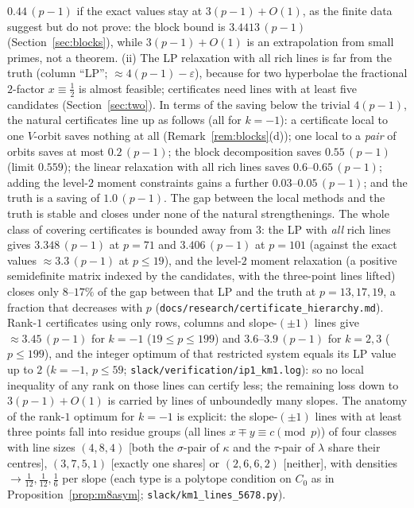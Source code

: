 \documentclass[11pt]{article}
\theoremstyle{remark}
\begin{document}
$0.44\,(p-1)$ if the exact values stay at $3(p-1)+O(1)$, as the finite data suggest but do not prove: the block bound is $3.4413\,(p-1)$ (Section~\ref{sec:blocks}), while $3(p-1)+O(1)$ is an extrapolation from small primes, not a theorem.  (ii) The LP relaxation with all rich lines is far
from the truth (column ``LP''; $\approx4(p-1)-\varepsilon$), because for two hyperbolae the fractional $2$-factor $x\equiv\tfrac12$ is
almost feasible; certificates need lines with at least five candidates (Section~\ref{sec:two}).  In terms of the saving below the trivial $4(p-1)$, the natural certificates line up as follows (all for $k=-1$):
a certificate local to one $V$-orbit saves nothing at all (Remark~\ref{rem:blocks}(d)); one local to a \emph{pair} of orbits saves at most
$0.2\,(p-1)$; the block decomposition saves $0.55\,(p-1)$ (limit $0.559$); the linear relaxation with all rich lines saves
$0.6$--$0.65\,(p-1)$; adding the level-$2$ moment constraints gains a further $0.03$--$0.05\,(p-1)$; and the truth is a saving of
$1.0\,(p-1)$.  The gap between the local methods and the truth is stable and closes under none of the natural strengthenings.
The whole class of covering certificates is bounded away from $3$: the LP with \emph{all}
rich lines gives $3.348\,(p-1)$ at $p=71$ and $3.406\,(p-1)$ at $p=101$ (against the exact values $\approx3.3\,(p-1)$ at $p\le19$), and the
level-$2$ moment relaxation (a positive semidefinite matrix indexed by the candidates, with the three-point lines lifted) closes only
$8$--$17\%$ of the gap between that LP and the truth at $p=13,17,19$, a fraction that decreases with $p$
(\texttt{docs/research/certificate\_hierarchy.md}).  Rank-$1$ certificates using only
rows, columns and slope-$(\pm1)$ lines give $\approx3.45\,(p-1)$ for $k=-1$ ($19\le p\le199$) and $3.6$--$3.9\,(p-1)$ for $k=2,3$
($p\le199$), and the integer optimum of that restricted system equals its LP value up to $2$ ($k=-1$, $p\le59$; \texttt{slack/verification/ip1\_km1.log}): so no local
inequality of any rank on those lines can certify less; the remaining loss down to $3(p-1)+O(1)$ is carried by lines of unboundedly
many slopes.  The anatomy of the rank-$1$ optimum for $k=-1$ is explicit: the slope-$(\pm1)$ lines with at least three points fall into
residue groups (all lines $x\mp y\equiv c\pmod p$) of four classes with line sizes $(4,8,4)$ [both the $\sigma$-pair of $\kappa$ and the
$\tau$-pair of $\lambda$ share their centres], $(3,7,5,1)$ [exactly one shares] or $(2,6,6,2)$ [neither], with densities $\to\tfrac1{12},
\tfrac1{12},\tfrac16$ per slope (each type is a polytope condition on $C_0$ as in Proposition~\ref{prop:m8asym}; \texttt{slack/km1\_lines\_5678.py}).
\end{document}
